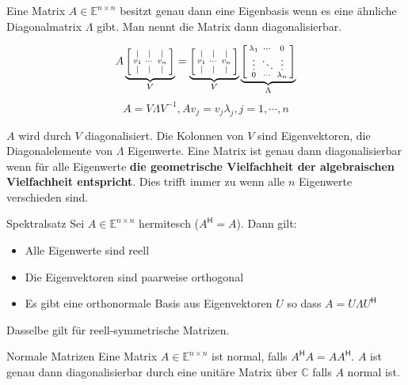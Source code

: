 \documentclass[a4paper,10pt]{article}
\newcommand*{\hermconj}{\mathsf{H}}
\def\C{\mathbb{C}}
\def\E{\mathbb{E}}
\begin{document}
Eine Matrix $A \in \E^{n \times n}$ besitzt genau dann eine Eigenbasis wenn es eine ähnliche Diagonalmatrix $\Lambda$ gibt. Man nennt die Matrix dann diagonalisierbar.

$$A \underbrace{\begin{bsmallmatrix}
  \vert & \vert & \vert \\
  v_1   & \cdots & v_n   \\
  \vert & \vert & \vert
\end{bsmallmatrix}}_V = \underbrace{\begin{bsmallmatrix}
  \vert & \vert & \vert \\
  v_1   & \cdots & v_n   \\
  \vert & \vert & \vert
\end{bsmallmatrix}}_V \underbrace{\begin{bsmallmatrix}
  \lambda_1 & \cdots & 0 \\
  \vdots & \ddots & \vdots \\
  0 & \cdots & \lambda_n
\end{bsmallmatrix}}_\Lambda$$ $$ A = V \Lambda V^{-1}, Av_j = v_j \lambda_j, j = 1, \cdots, n$$

$A$ wird durch $V$ diagonalisiert. Die Kolonnen von $V$ sind Eigenvektoren, die Diagonalelemente von $\Lambda$ Eigenwerte. Eine Matrix ist genau dann diagonalisierbar wenn für alle Eigenwerte \textbf{die geometrische Vielfachheit der algebraischen Vielfachheit entspricht}. Dies trifft immer zu wenn alle $n$ Eigenwerte verschieden sind.

\begin{subbox}{Spektralsatz}
  Sei $A \in \E^{n \times n}$ hermitesch ($A^\hermconj = A$). Dann gilt:
  \begin{itemize}
    \item Alle Eigenwerte sind reell
    \item Die Eigenvektoren sind paarweise orthogonal
    \item Es gibt eine orthonormale Basis aus Eigenvektoren $U$ so dass $A = U \Lambda U^\hermconj$
  \end{itemize}
  Dasselbe gilt für reell-symmetrische Matrizen.
\end{subbox}

\begin{subbox}{Normale Matrizen}
  Eine Matrix $A \in \E^{n \times n}$ ist normal, falls $A^\hermconj A = A A^\hermconj$. $A$ ist genau dann diagonalisierbar durch eine unitäre Matrix über $\C$ falls $A$ normal ist. 
\end{subbox}
\end{document}
